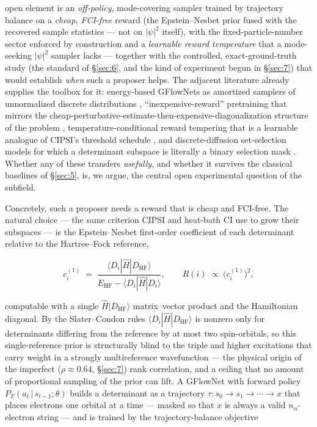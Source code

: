 \documentclass[11pt]{article}
\begin{document}
open element is an \emph{off-policy}, mode-covering sampler trained by trajectory balance on a \emph{cheap, FCI-free} reward (the Epstein--Nesbet prior fused with the recovered sample statistics --- not on $|\psi|^2$ itself), with the fixed-particle-number sector enforced by construction and a \emph{learnable reward temperature} that a mode-seeking $|\psi|^2$ sampler lacks --- together with the controlled, exact-ground-truth study (the standard of \S\ref{sec:6}, and the kind of experiment begun in \S\ref{sec:7}) that would establish \emph{when} such a proposer helps. The adjacent literature already supplies the toolbox for it: energy-based GFlowNets as amortized samplers of unnormalized discrete distributions \cite{zhangd2022}, ``inexpensive-reward'' pretraining that mirrors the cheap-perturbative-estimate-then-expensive-diagonalization structure of the problem \cite{pandey2024}, temperature-conditional reward tempering that is a learnable analogue of CIPSI's threshold schedule \cite{kim2024}, and discrete-diffusion set-selection models for which a determinant subspace is literally a binary selection mask \cite{sun2023}. Whether any of these transfers \emph{usefully}, and whether it survives the classical baselines of \S\ref{sec:5}, is, we argue, the central open experimental question of the subfield.

Concretely, such a proposer needs a reward that is cheap and FCI-free. The natural choice --- the same criterion CIPSI and heat-bath CI use to grow their subspaces --- is the Epstein--Nesbet first-order coefficient of each determinant relative to the Hartree--Fock reference,

\begin{equation}
c^{(1)}_i \;=\; \frac{\langle D_i|\hat H|D_{\mathrm{HF}}\rangle}{E_{\mathrm{HF}} - \langle D_i|\hat H|D_i\rangle}, \qquad R(i) \;\propto\; \big(c^{(1)}_i\big)^2,
\end{equation}

computable with a single $\hat H|D_{\mathrm{HF}}\rangle$ matrix--vector product and the Hamiltonian diagonal. By the Slater--Condon rules $\langle D_i|\hat H|D_{\mathrm{HF}}\rangle$ is nonzero only for determinants differing from the reference by at most two spin-orbitals, so this single-reference prior is structurally blind to the triple and higher excitations that carry weight in a strongly multireference wavefunction --- the physical origin of the imperfect ($\rho{\approx}0.64$, \S\ref{sec:7}) rank correlation, and a ceiling that no amount of proportional sampling of the prior can lift. A GFlowNet with forward policy $P_F(a_t\,|\,s_{t-1};\theta)$ builds a determinant as a trajectory $\tau: s_0\to s_1\to\cdots\to x$ that places electrons one orbital at a time --- masked so that $x$ is always a valid $n_\alpha$-electron string --- and is trained by the trajectory-balance objective
\end{document}
